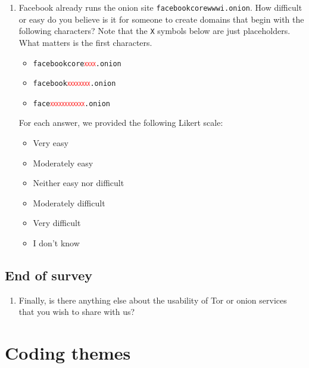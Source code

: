 \begin{enumerate}
    \item Facebook already runs the onion site \texttt{facebookcorewwwi.onion}.
        How difficult or easy do you believe is it for someone to create domains
        that begin with the following characters? Note that the {\color{red}
        \texttt{X}} symbols below
        are just placeholders. What matters is the first characters.
        \begin{itemize}
            \item \texttt{facebookcore\textcolor{red}{\textsc{xxxx}}.onion}
            \item \texttt{facebook\textcolor{red}{\textsc{xxxxxxxx}}.onion}
            \item \texttt{face\textcolor{red}{\textsc{xxxxxxxxxxxx}}.onion}
        \end{itemize}
        For each answer, we provided the following Likert scale:
        \begin{itemize}
            \item Very easy
            \item Moderately easy
            \item Neither easy nor difficult
            \item Moderately difficult
            \item Very difficult
            \item I don't know
        \end{itemize}
\end{enumerate}

\subsection{End of survey}
\begin{enumerate}
    \item Finally, is there anything else about the usability of Tor or onion
        services that you wish to share with us?
\end{enumerate}

\section{Coding themes}
\label{sec:coding-themes}

